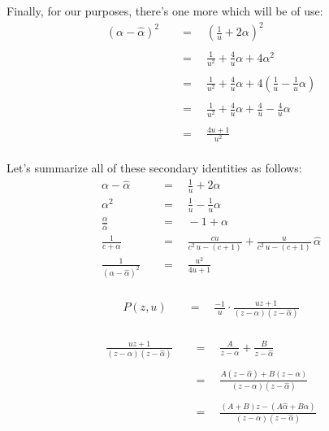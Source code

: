 \documentclass[twoside]{article}
\newcommand{\equals}{\ensuremath{\quad =\quad}}
\newcommand{\alphahat}{\ensuremath{\hat{\alpha}}}
\begin{document}
Finally, for our purposes, there's one more which will be of use:
\begin{align*}
(\alpha-\alphahat)^2	& \equals \left(\frac{1}{u}+2\alpha\right)^2							\\
															\\
			& \equals \frac{1}{u^2}+\frac{4}{u}\alpha+4\alpha^2						\\
															\\
			& \equals \frac{1}{u^2}+\frac{4}{u}\alpha+4\left(\frac{1}{u}-\frac{1}{u}\alpha\right)		\\
															\\
			& \equals \frac{1}{u^2}+\frac{4}{u}\alpha+\frac{4}{u}-\frac{4}{u}\alpha				\\
															\\
			& \equals \frac{4u+1}{u^2}									\\
\end{align*}

Let's summarize all of these secondary identities as follows:
\begin{align}
\alpha-\alphahat			& \equals \frac{1}{u}+2\alpha							\\
\alpha^2				& \equals \frac{1}{u}-\frac{1}{u}\alpha						\\
\frac{\alpha}{\alphahat}		& \equals -1+\alpha								\\
\frac{1}{c+\alpha}			& \equals \frac{cu}{c^2\,u-(c+1)}+\frac{u}{c^2\,u-(c+1)}\,\alphahat		\\
\frac{1}{(\alpha-\alphahat)^2}		& \equals \frac{u^2}{4u+1}							\\
\end{align}

\begin{align*}
P(z,u)	& \equals \frac{-1}{u} \cdot \frac{uz+1}{(z-\alpha)(z-\alphahat)}		\\
\end{align*}

\begin{align*}
\frac{uz+1}{(z-\alpha)(z-\alphahat)}	& \equals \frac{A}{z-\alpha}+\frac{B}{z-\alphahat}				\\
															\\
					& \equals \frac{A(z-\alphahat)+B(z-\alpha)}{(z-\alpha)(z-\alphahat)}		\\
															\\
					& \equals \frac{(A+B)z-(A\alphahat+B\alpha)}{(z-\alpha)(z-\alphahat)}		\\
\end{align*}
\end{document}
